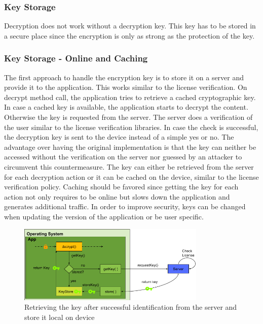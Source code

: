 \subsubsection{Key Storage} \label{section:counter-replace-encryption-key-online}
Decryption does not work without a decryption key.
This key has to be stored in a secure place since the encryption is only as strong as the protection of the key.

\subsubsection{Key Storage - Online and Caching} \label{section:counter-replace-encryption-key-online}
The first approach to handle the encryption key is to store it on a server and provide it to the application.
This works similar to the license verification.
\newline
On decrypt method call, the application tries to retrieve a cached cryptographic key.
In case a cached key is available, the application starts to decrypt the content.
Otherwise the key is requested from the server.
The server does a verification of the user similar to the license verification libraries.
In case the check is successful, the decryption key is sent to the device instead of a simple yes or no.
The advantage over having the original implementation is that the key can neither be accessed without the verification on the server nor guessed by an attacker to circumvent this countermeasure.
\newline
The key can either be retrieved from the server for each decryption action or it can be cached on the device, similar to the license verification policy.
Caching should be favored since getting the key for each action not only requires to be online but slows down the application and generates additional traffic.
\newline
In order to improve security, keys can be changed when updating the version of the application or be user specific.
\begin{figure}[h]
    \centering
    \includegraphics[width=0.8\textwidth]{data/encryptionKeyServer.png}
    \caption{Retrieving the key after successful identification from the server and store it local on device}
    \label{fig:encryptionKeyServer}
\end{figure}


